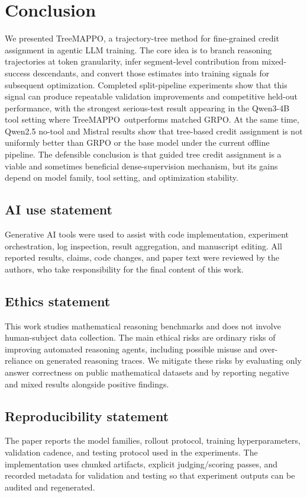 \documentclass{article}
\newcommand{\ours}{TreeMAPPO}
\begin{document}
\section{Conclusion}
We presented \ours, a trajectory-tree method for fine-grained credit assignment in agentic LLM training. The core idea is to branch reasoning trajectories at token granularity, infer segment-level contribution from mixed-success descendants, and convert those estimates into training signals for subsequent optimization. Completed split-pipeline experiments show that this signal can produce repeatable validation improvements and competitive held-out performance, with the strongest serious-test result appearing in the Qwen3-4B tool setting where \ours\ outperforms matched GRPO. At the same time, Qwen2.5 no-tool and Mistral results show that tree-based credit assignment is not uniformly better than GRPO or the base model under the current offline pipeline. The defensible conclusion is that guided tree credit assignment is a viable and sometimes beneficial dense-supervision mechanism, but its gains depend on model family, tool setting, and optimization stability.

\subsection*{AI use statement}
Generative AI tools were used to assist with code implementation, experiment orchestration, log inspection, result aggregation, and manuscript editing. All reported results, claims, code changes, and paper text were reviewed by the authors, who take responsibility for the final content of this work.

\subsection*{Ethics statement}
This work studies mathematical reasoning benchmarks and does not involve human-subject data collection. The main ethical risks are ordinary risks of improving automated reasoning agents, including possible misuse and over-reliance on generated reasoning traces. We mitigate these risks by evaluating only answer correctness on public mathematical datasets and by reporting negative and mixed results alongside positive findings.

\subsection*{Reproducibility statement}
The paper reports the model families, rollout protocol, training hyperparameters, validation cadence, and testing protocol used in the experiments. The implementation uses chunked artifacts, explicit judging/scoring passes, and recorded metadata for validation and testing so that experiment outputs can be audited and regenerated.



\end{document}
